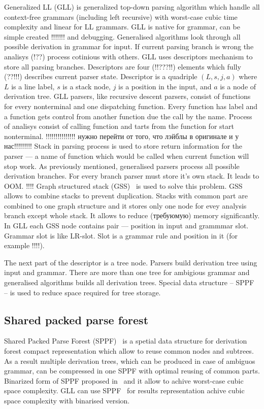 \documentclass{sig-alternate} %
\begin{document}
Generalized LL (GLL) is generalized top-down parsing algorithm which handle all context-free grammars (including left recursive) with worst-case cubic time complexity and linear for LL grammars.
GLL is native for grammar, can be simple created !!!!!!! and debugging. Generalised algorithms look through all possible derivation in grammar for input. If current parsing branch is wrong the analisys (!??) process cotinious with others. 
GLL uses descriptors mechanism to store all parsing branches. Descriptors are four (!!???!!) elements which fully (??!!!) describes current parser state. Descriptor is a quadriple $(L, s, j, a)$ where $L$ is a line label, $s$ is a stack node, $j$ is a position in the input, and $a$ is a node of derivation tree. GLL parsers, like recursive descent parsers, consist of functions for every nonterminal and one dispatching function. Every function has label and a function gets control from another function due the call by the name. Process of analisys consist of calling function and tarts from the function for start nonterminal. !!!!!!!!!!!!!!!  нужно перейти от того, что лэйблы в оригинале и у нас!!!!!!!!!
Stack in parsing process is used to store return information for the parser --- a name of function which would be called when current function will stop work. As previously mentioned, generalised parsers process all possible derivation branches. For every branch parser must store it's own stack. It leads to OOM. !!!!  
Graph structured stack (GSS)~\cite{Tomita} is used to solve this problem. GSS allows to combine stacks to prevent duplication. Stacks with common part are combined to one graph structure and it stores only one node for evey analysis branch except whole stack. It allows to reduce (требуюмую) memory significantly. 
In GLL each GSS node contains pair --- position in input and grammmar slot. Grammar slot is like LR-slot. Slot is a grammar rule and position in it (for example !!!!).

The next part of the descriptor is a tree node. Parsers build derivation tree using input and grammar. There are more than one tree for ambigious grammar and generalised algorithms builds all derivation trees. Special data structure -- SPPF -- is used to reduce space required for tree storage.

\subsection{Shared packed parse forest}

Shared Packed Parse Forest (SPPF)~\cite{SPPF} is a spetial data structure for derivation forest compact representation which allow to reuse common nodes and subtrees.
As a result multiple derivation trees, which can be produced in case of ambiguos grammar, can be compressed in one SPPF with optimal reusing of common parts.  
Binarized form of SPPF proposed in~\cite{brnglr} and it allow to achive worst-case cubic space complexity.
GLL can use SPPF~\cite{gllParsingTree} for results representation achive cubic space complexity with binarised version.
\end{document}
